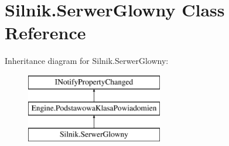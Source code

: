 \hypertarget{class_silnik_1_1_serwer_glowny}{}\section{Silnik.\+Serwer\+Glowny Class Reference}
\label{class_silnik_1_1_serwer_glowny}
Inheritance diagram for Silnik.\+Serwer\+Glowny\+:\begin{figure}[H]
\begin{center}
\leavevmode
\includegraphics[height=3.000000cm]{class_silnik_1_1_serwer_glowny}
\end{center}
\end{figure}
